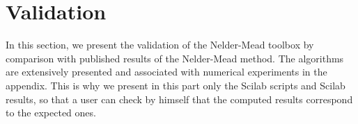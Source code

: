 \chapter{Validation}

In this section, we present the validation of the Nelder-Mead 
toolbox by comparison with published results of the Nelder-Mead 
method. The algorithms are extensively presented and 
associated with numerical experiments in the appendix.
This is why we present in this part only the Scilab scripts and 
Scilab results, so that a user can check by himself that the
computed results correspond to the expected ones.


